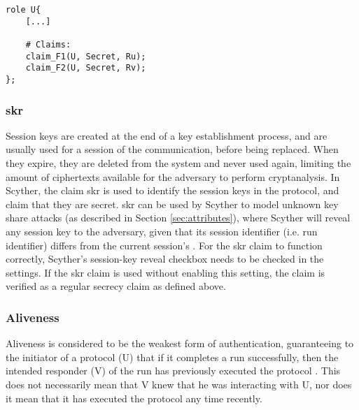\begin{lstlisting}[caption={Example of how to claim secrecy for terms in Scyther.}, label={lst:cl-sec}]
role U{
	[...]
	
	# Claims:
	claim_F1(U, Secret, Ru);
	claim_F2(U, Secret, Rv);
};
\end{lstlisting}




\subsubsection{\gls{skr}}

Session keys are created at the end of a key establishment process, and are usually used for a session of the communication, before being replaced. When they expire, they are deleted from the system and never used again, limiting the amount of ciphertexts available for the adversary to perform cryptanalysis. In Scyther, the claim \gls{skr} is used to identify the session keys in the protocol, and claim that they are secret.  \gls{skr} can be used by Scyther to model unknown key share attacks (as described in Section \ref{sec:attributes}), where Scyther will reveal any session key to the adversary, given that its session identifier (i.e. run identifier) differs from the current session's \cite{cremers2014improving}. For the \gls{skr} claim to function correctly, Scyther's session-key reveal checkbox needs to be checked in the settings. If the \gls{skr} claim is used without enabling this setting, the claim is verified as a regular secrecy claim as defined above.




\subsubsection{Aliveness}

Aliveness is considered to be the weakest form of authentication, guaranteeing to the initiator of a protocol (U) that if it completes a run successfully, then the intended responder (V) of the run has previously executed the protocol \cite{lowe1997hierarchy}. This does not necessarily mean that V knew that he was interacting with U, nor does it mean that it has executed the protocol any time recently. 


